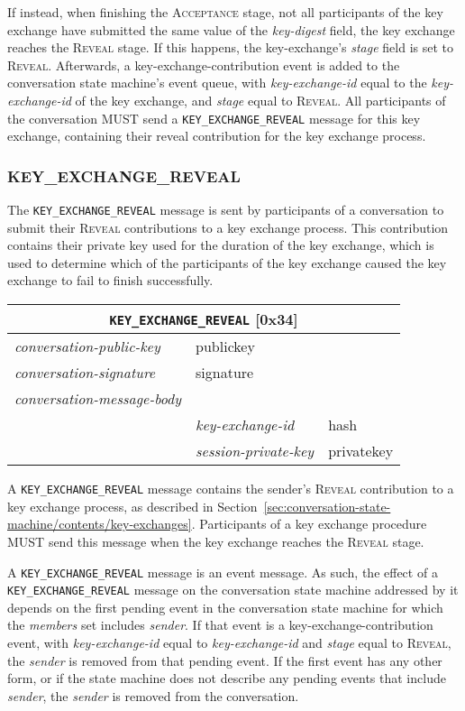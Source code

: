 \documentclass{article}
\def\message#1{\texttt{#1}}
\def\field#1{\textit{#1}}
\def\smfield#1{\textsl{#1}}
\def\type#1{\textsf{#1}}
\newenvironment{conversationmessage}[2]{
\newcommand{\messagefield}[2]{
& \field{##1} & \type{##2} \\
\hline
}
\hspace{2em minus 2em}\begin{tabular}{|l|l|l|}
\hline
\multicolumn{3}{|c|}{\message{#1} [#2]} \\
\hline
\hline
\field{conversation-public-key} & \multicolumn{2}{l|}{\type{publickey}} \\
\hline
\field{conversation-signature} & \multicolumn{2}{l|}{\type{signature}} \\
\hline
\field{conversation-message-body} & \multicolumn{2}{l|}{} \\
\hline
}{
\end{tabular}
}
\begin{document}
If instead, when finishing the \textsc{Acceptance} stage, not all participants of the key exchange have submitted the same value of the \smfield{key-digest} field, the key exchange reaches the \textsc{Reveal} stage.
If this happens, the \type{key-exchange}'s \smfield{stage} field is set to \textsc{Reveal}.
Afterwards, a \type{key-exchange-contribution} event is added to the conversation state machine's event queue, with \smfield{key-exchange-id} equal to the \smfield{key-exchange-id} of the key exchange, and \smfield{stage} equal to \textsc{Reveal}.
All participants of the conversation MUST send a \message{KEY\_EXCHANGE\_REVEAL} message for this key exchange, containing their reveal contribution for the key exchange process.


\subsubsection{KEY\_EXCHANGE\_REVEAL}
\label{sec:messages/key-exchange-reveal}

The \message{KEY\_EXCHANGE\_REVEAL} message is sent by participants of a conversation to submit their \textsc{Reveal} contributions to a key exchange process.
This contribution contains their private key used for the duration of the key exchange, which is used to determine which of the participants of the key exchange caused the key exchange to fail to finish successfully.

\begin{conversationmessage}{KEY\_EXCHANGE\_REVEAL}{0x34}
\messagefield{key-exchange-id}{hash}
\messagefield{session-private-key}{privatekey}
\end{conversationmessage}

A \message{KEY\_EXCHANGE\_REVEAL} message contains the sender's \textsc{Reveal} contribution to a key exchange process, as described in Section~\ref{sec:conversation-state-machine/contents/key-exchanges}.
Participants of a key exchange procedure MUST send this message when the key exchange reaches the \textsc{Reveal} stage.

A \message{KEY\_EXCHANGE\_REVEAL} message is an event message.
As such, the effect of a \message{KEY\_EXCHANGE\_REVEAL} message on the conversation state machine addressed by it depends on the first pending event in the conversation state machine for which the \smfield{members} set includes \field{sender}.
If that event is a \type{key-exchange-contribution} event, with \smfield{key-exchange-id} equal to \field{key-exchange-id} and \smfield{stage} equal to \textsc{Reveal}, the \field{sender} is removed from that pending event.
If the first event has any other form, or if the state machine does not describe any pending events that include \field{sender}, the \field{sender} is removed from the conversation.
\end{document}
